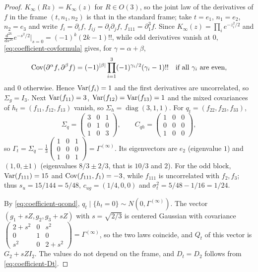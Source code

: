 \begin{proof}
$K_\infty(Rz)=K_\infty(z)$ for $R\in O(3)$, so the joint law of the derivatives of $f$ in the frame $(t,n_1,n_2)$ is that in the standard frame; take $t=e_1$, $n_1=e_2$, $n_2=e_3$ and write $f_i=\partial_if$, $f_{ij}=\partial_i\partial_jf$, $f_{111}=\partial_1^3f$. Since $K_\infty(z)=\prod_ie^{-z_i^2/2}$ and $\frac{d^{2k}}{ds^{2k}}e^{-s^2/2}\big|_{s=0}=(-1)^k(2k-1)!!$, while odd derivatives vanish at $0$, \eqref{eq:coefficient-covformula} gives, for $\gamma=\alpha+\beta$,
\[
\operatorname{Cov}(\partial^\alpha f,\partial^\beta f)=(-1)^{|\beta|}\prod_{i=1}^3(-1)^{\gamma_i/2}(\gamma_i-1)!!\quad\text{if all }\gamma_i\text{ are even},
\]
and $0$ otherwise. Hence $\operatorname{Var}(f_i)=1$ and the first derivatives are uncorrelated, so $\Sigma_g=I_3$. Next $\operatorname{Var}(f_{11})=3$, $\operatorname{Var}(f_{12})=\operatorname{Var}(f_{13})=1$ and the mixed covariances of $h_t=(f_{11},f_{12},f_{13})$ vanish, so $\Sigma_h=\operatorname{diag}(3,1,1)$. For $q_t=(f_{22},f_{23},f_{33})$,
\[
\Sigma_q=\begin{pmatrix}3&0&1\\0&1&0\\1&0&3\end{pmatrix},\qquad
C_{qh}=\begin{pmatrix}1&0&0\\0&0&0\\1&0&0\end{pmatrix},
\]
so $\Gamma_t=\Sigma_q-\frac13\begin{pmatrix}1&0&1\\0&0&0\\1&0&1\end{pmatrix}=\Gamma^{(\infty)}$. Its eigenvectors are $e_2$ (eigenvalue $1$) and $(1,0,\pm1)$ (eigenvalues $8/3\pm2/3$, that is $10/3$ and $2$). For the odd block, $\operatorname{Var}(f_{111})=15$ and $\operatorname{Cov}(f_{111},f_1)=-3$, while $f_{111}$ is uncorrelated with $f_2,f_3$; thus $s_u=15/144=5/48$, $c_{ug}=(1/4,0,0)$ and $\sigma_t^2=5/48-1/16=1/24$.

By \eqref{eq:coefficient-qcond}, $q_t\mid\{h_t=0\}\sim N(0,\Gamma^{(\infty)})$. The vector $(g_1+sZ,g_2,g_3+sZ)$ with $s=\sqrt{2/3}$ is centered Gaussian with covariance $\begin{pmatrix}2+s^2&0&s^2\\0&1&0\\s^2&0&2+s^2\end{pmatrix}=\Gamma^{(\infty)}$, so the two laws coincide, and $Q_t$ of this vector is $G_2+sZI_2$. The values do not depend on the frame, and $D_t=D_2$ follows from \eqref{eq:coefficient-Dt}.
\end{proof}

